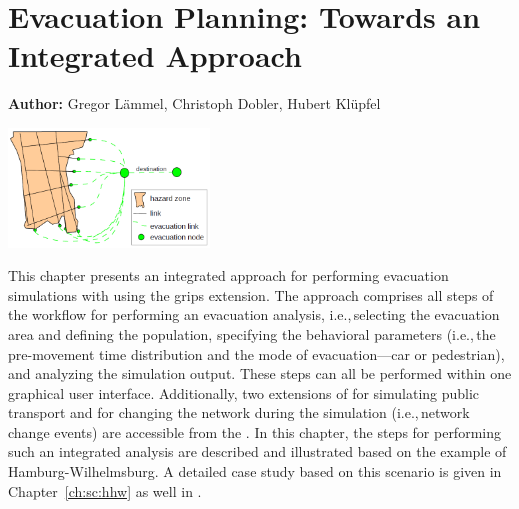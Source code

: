 \chapter{Evacuation Planning: Towards an Integrated Approach}
\label{ch:evacuation}

\hfill \textbf{Author:} Gregor Lämmel, Christoph Dobler, Hubert Klüpfel 

\begin{center} \includegraphics[width=0.4\textwidth, angle=0]{extending/figures/Evacuation/evacuation} \end{center}


This chapter presents an integrated approach for performing evacuation simulations with  using the \gls{grips} extension. %
The approach comprises all steps of the workflow for performing an evacuation analysis, i.e.,\,selecting the evacuation area and defining the population, specifying the behavioral parameters (i.e.,\,the pre-movement time distribution and the mode of evacuation---car or pedestrian), and analyzing the simulation output. These steps can all be performed within one graphical user interface. Additionally, two extensions of  for simulating public transport and for changing the network during the simulation (i.e.,\,network change events) are accessible from the . In this chapter, the steps for performing such an integrated analysis are described and illustrated based on the example of Hamburg-Wilhelmsburg. A detailed case study based on this scenario is given in Chapter~\ref{ch:sc:hhw} as well in \citet{DurstAtAl2012PEDGRIPSAppl,Hugenbusch2012Bachelor}.

